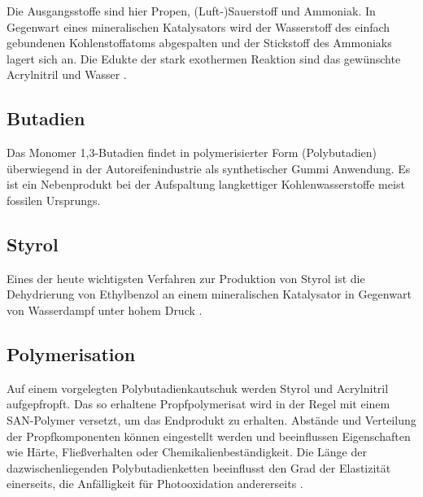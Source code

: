             Die Ausgangsstoffe sind hier Propen, (Luft-)Sauerstoff und Ammoniak. In Gegenwart eines mineralischen Katalysators wird der Wasserstoff
            des einfach gebundenen Kohlenstoffatoms abgespalten und der Stickstoff des Ammoniaks lagert sich an. Die Edukte der
            stark exothermen Reaktion sind das gewünschte Acrylnitril und Wasser \cite{sohio.process.patent.1959.9201957}.

        \subsection*{Butadien}
            Das Monomer 1,3-Butadien findet in polymerisierter Form (Polybutadien) überwiegend in der Autoreifenindustrie als synthetischer Gummi
            Anwendung. Es ist ein Nebenprodukt bei der Aufspaltung langkettiger Kohlenwasserstoffe meist fossilen Ursprungs.

        \subsection*{Styrol}
            Eines der heute wichtigsten Verfahren zur Produktion von Styrol ist die Dehydrierung von Ethylbenzol
            an einem mineralischen Katalysator in Gegenwart von Wasserdampf unter hohem Druck \cite{styrol.synthese.Liquid.Phase.Alkylation.of.Benzene.Bellussi.1995}.

        \subsection{Polymerisation}
            Auf einem vorgelegten Polybutadienkautschuk werden Styrol und Acrylnitril aufgepfropft. Das so erhaltene Propfpolymerisat
            wird in der Regel mit einem SAN-Polymer versetzt, um das Endprodukt zu erhalten. Abstände und Verteilung der
            Propfkomponenten können eingestellt werden und beeinflussen Eigenschaften wie Härte, Fließverhalten oder
            Chemikalienbeständigkeit. Die Länge der dazwischenliegenden Polybutadienketten beeinflusst den Grad der Elastizität
            einerseits, die Anfälligkeit für Photooxidation andererseits \cite{Domininghaus.1998.Kunststoffe.und.ihre.Eigenschaften}.

